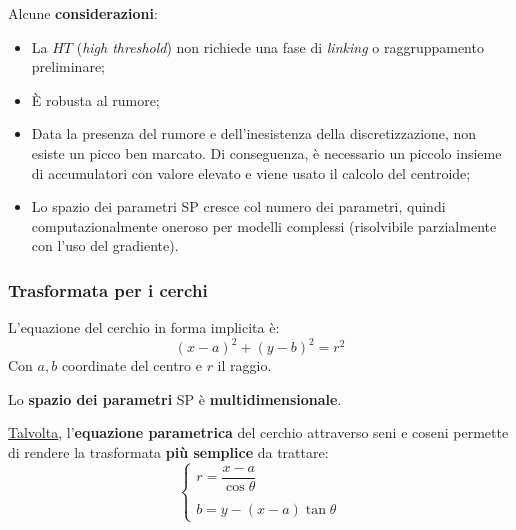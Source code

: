 \documentclass[a4paper]{article}
\begin{document}
	\noindent
	Alcune \textbf{considerazioni}:
	\begin{itemize}
		\item[\textcolor{Green4}{\ding{51}}] La $HT$ (\emph{high threshold}) non richiede una fase di \emph{linking} o raggruppamento preliminare;
		
		\item[\textcolor{Green4}{\ding{51}}] È robusta al rumore;
		
		\item[\textcolor{Red3}{\ding{55}}] Data la presenza del rumore e dell'inesistenza della discretizzazione, non esiste un picco ben marcato. Di conseguenza, è necessario un piccolo insieme di accumulatori con valore elevato e viene usato il calcolo del centroide;
		
		\item[\textcolor{Red3}{\ding{55}}] Lo spazio dei parametri SP cresce col numero dei parametri, quindi computazionalmente oneroso per modelli complessi (risolvibile parzialmente con l'uso del gradiente).
	\end{itemize}\newpage

	\subsubsection{Trasformata per i cerchi}
	
	L'equazione del cerchio in forma implicita è:
	\begin{equation*}
		\left(x-a\right)^{2} + \left(y-b\right)^{2} = r^{2}
	\end{equation*}
	Con $a,b$ coordinate del centro e $r$ il raggio.\newline
	
	\noindent
	Lo \textbf{spazio dei parametri} SP è \textbf{multidimensionale}.\newline
	
	\noindent
	\underline{Talvolta}, l'\textbf{equazione parametrica} del cerchio attraverso seni e coseni permette di rendere la trasformata \textbf{più semplice} da trattare:
	\begin{equation*}
		\begin{cases}
			r =\dfrac{x-a}{\cos\theta} \\
			\\
			b = y - \left(x-a\right) \tan\theta
		\end{cases}
	\end{equation*}
	
\end{document}
